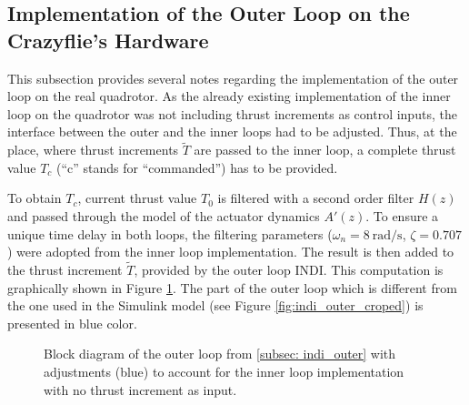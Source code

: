 \documentclass[11pt, a4paper, twoside]{report}
\begin{document}
\subsection{Implementation of the Outer Loop on the Crazyflie's Hardware} \label{subsec:outer_hardware_implementation}

This subsection provides several notes regarding the implementation of the outer loop on the real quadrotor. As the already existing implementation of the inner loop on the quadrotor was not including thrust increments as control inputs, the interface between the outer and the inner loops had to be adjusted. Thus, at the place, where thrust increments $\tilde{T}$ are passed to the inner loop, a complete thrust value $T_c$ (``c'' stands for ``commanded'') has to be provided.

To obtain $T_c$, current thrust value $T_0$ is filtered with a second order filter $H(z)$ and passed through the model of the actuator dynamics $A'(z)$. To ensure a unique time delay in both loops, the filtering parameters ($\omega_n=8~\si{\radian/\second}$, $\zeta=0.707$) were adopted from the inner loop implementation. The result is then added to the thrust increment $\tilde{T}$, provided by the outer loop \acrshort{INDI}. This computation is graphically shown in Figure \ref{fig:outer_loop_hw}. The part of the outer loop which is different from the one used in the Simulink model (see Figure \ref{fig:indi_outer_croped}) is presented in blue color. 

\begin{figure}[H]
	\centering 
	\captionsetup{justification=centering, singlelinecheck=off, font=bf, belowskip=-0.5cm}
	\caption[Block diagram of the outer loop with adjustments]{Block diagram of the outer loop from \ref{subsec: indi_outer} with adjustments (blue) to account for the inner loop implementation with no thrust increment as input.}
	\label{fig:outer_loop_hw}
\end{figure}
\end{document}
